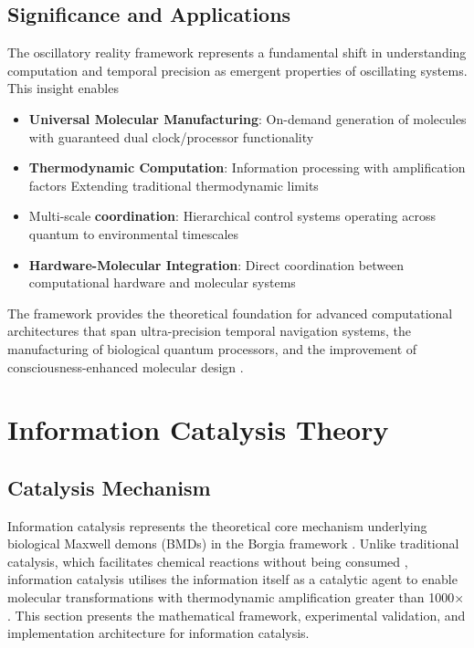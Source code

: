 \documentclass[12pt,a4paper]{article}
\begin{document}
\subsection{Significance and Applications}

The oscillatory reality framework represents a fundamental shift in understanding computation and temporal precision as emergent properties of oscillating systems. This insight enables

\begin{itemize}
\item \textbf{Universal Molecular Manufacturing}: On-demand generation of molecules with guaranteed dual clock/processor functionality
\item \textbf{Thermodynamic Computation}: Information processing with amplification factors Extending traditional thermodynamic limits
\item Multi-scale \textbf{coordination}: Hierarchical control systems operating across quantum to environmental timescales
\item \textbf{Hardware-Molecular Integration}: Direct coordination between computational hardware and molecular systems
\end{itemize}

The framework provides the theoretical foundation for advanced computational architectures that span ultra-precision temporal navigation systems, the manufacturing of biological quantum processors, and the improvement of consciousness-enhanced molecular design \cite{ball2011physics}.

\section{Information Catalysis Theory}

\subsection{Catalysis Mechanism}

Information catalysis represents the theoretical core mechanism underlying biological Maxwell demons (BMDs) in the Borgia framework \cite{mizraji2007biological}. Unlike traditional catalysis, which facilitates chemical reactions without being consumed \cite{atkins2010physical}, information catalysis utilises the information itself as a catalytic agent to enable molecular transformations with thermodynamic amplification greater than 1000× \cite{landauer1961irreversibility}. This section presents the mathematical framework, experimental validation, and implementation architecture for information catalysis.
\end{document}
